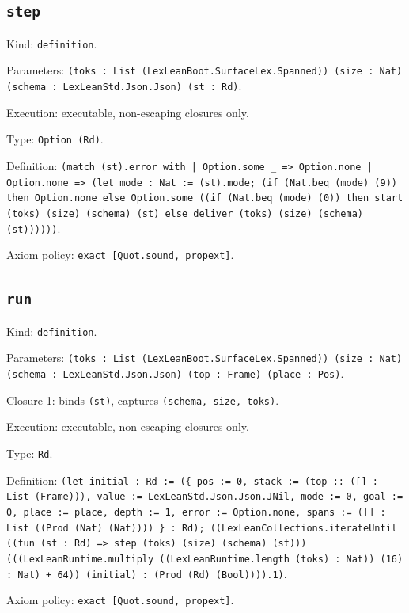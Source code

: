 \documentclass[11pt]{article}
\begin{document}
\subsection*{\texttt{step}}
\noindent Kind: \texttt{definition}.\par
\noindent Parameters: \texttt{(toks : List (LexLeanBoot.SurfaceLex.Spanned)) (size : Nat) (schema : LexLeanStd.Json.Json) (st : Rd)}.\par
\noindent Execution: executable, non-escaping closures only.\par
\noindent Type: \texttt{Option (Rd)}.\par
\noindent Definition: \texttt{(match (st).error with | Option.some \_ => Option.none | Option.none => (let mode : Nat := (st).mode; (if (Nat.beq (mode) (9)) then Option.none else Option.some ((if (Nat.beq (mode) (0)) then start (toks) (size) (schema) (st) else deliver (toks) (size) (schema) (st))))))}.\par
\noindent Axiom policy: \texttt{exact [Quot.sound, propext]}.\par
\subsection*{\texttt{run}}
\noindent Kind: \texttt{definition}.\par
\noindent Parameters: \texttt{(toks : List (LexLeanBoot.SurfaceLex.Spanned)) (size : Nat) (schema : LexLeanStd.Json.Json) (top : Frame) (place : Pos)}.\par
\noindent Closure 1: binds \texttt{(st)}, captures \texttt{(schema, size, toks)}.\par
\noindent Execution: executable, non-escaping closures only.\par
\noindent Type: \texttt{Rd}.\par
\noindent Definition: \texttt{(let initial : Rd := (\{ pos := 0, stack := (top :: ([] : List (Frame))), value := LexLeanStd.Json.Json.JNil, mode := 0, goal := 0, place := place, depth := 1, error := Option.none, spans := ([] : List ((Prod (Nat) (Nat)))) \} : Rd); ((LexLeanCollections.iterateUntil ((fun (st : Rd) => step (toks) (size) (schema) (st))) (((LexLeanRuntime.multiply ((LexLeanRuntime.length (toks) : Nat)) (16) : Nat) + 64)) (initial) : (Prod (Rd) (Bool)))).1)}.\par
\noindent Axiom policy: \texttt{exact [Quot.sound, propext]}.\par
\end{document}
